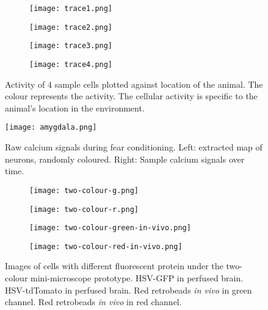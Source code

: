 \begin{figure}[h]
    \begin{subfigure}[t]{.5\linewidth}
        \texttt{[image: trace1.png]}
    \end{subfigure}
    \begin{subfigure}[t]{.5\linewidth}
        \texttt{[image: trace2.png]}
    \end{subfigure}
    \begin{subfigure}[t]{.5\linewidth}
        \texttt{[image: trace3.png]}
    \end{subfigure}
    \begin{subfigure}[t]{.5\linewidth}
        \texttt{[image: trace4.png]}
    \end{subfigure}
    \caption{Activity of 4 sample cells plotted against location of the animal. The colour represents the  activity. The cellular activity is specific to the animal's location in the environment. \label{f.traceplot}}
\end{figure}

\begin{figure}[h]
    \centering
    \texttt{[image: amygdala.png]}
    \caption{Raw calcium signals during fear conditioning. Left: extracted map of neurons, randomly coloured. Right: Sample calcium signals over time.\label{f.amygdala}}

\end{figure}

\begin{figure}[h]
    \begin{subfigure}[t]{.5\linewidth}
        \texttt{[image: two-colour-g.png]}
        \caption{\label{f.twocolour.g}}
    \end{subfigure}
    \begin{subfigure}[t]{.5\linewidth}
        \texttt{[image: two-colour-r.png]}
        \caption{\label{f.twocolour.r}}
    \end{subfigure}
    \begin{subfigure}[t]{.5\linewidth}
        \texttt{[image: two-colour-green-in-vivo.png]}
        \caption{\label{f.twocolour.g.invivo}}
    \end{subfigure}
    \begin{subfigure}[t]{.5\linewidth}
        \texttt{[image: two-colour-red-in-vivo.png]}
        \caption{\label{f.twocolour.r.invivo}}
    \end{subfigure}

    \caption{Images of cells with different fluorescent protein under the two-colour mini-microscope prototype.  HSV-GFP in perfused brain.  HSV-tdTomato in perfused brain.  Red retrobeads \textit{in vivo} in green channel.  Red retrobeads \textit{in vivo} in red channel. \label{f.twocolour}}
\end{figure}

